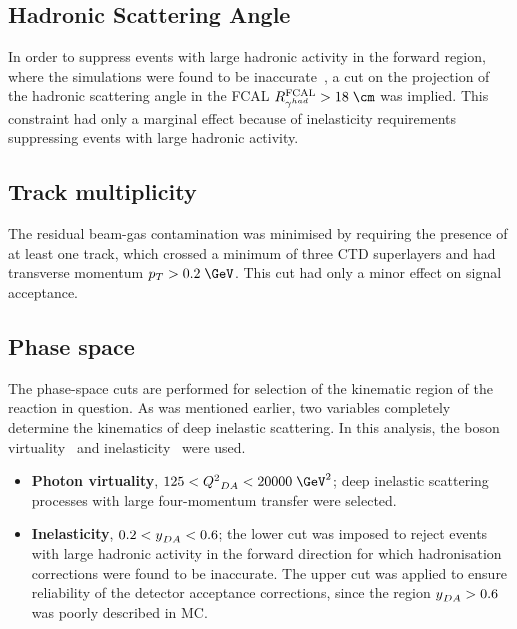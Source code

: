 \subsection{Hadronic Scattering Angle}
\label{subsec:gammahadcut}
In order to suppress events with large hadronic activity in the forward region, where the simulations were found to be inaccurate~\cite{thesis:jose:2003}, a cut on the projection of the hadronic scattering angle in the FCAL $R^\text{FCAL}_{\gamma^{had}} > 18\;\cm$ was implied. This constraint had only a marginal effect because of inelasticity requirements suppressing events with large hadronic activity.

\subsection{Track multiplicity}
\label{subsec:trackmultcut}
The residual beam-gas contamination was minimised by requiring the presence of at least one track, which crossed a minimum of three CTD superlayers and had transverse momentum $p_T>0.2\;\GeV$. This cut had only a minor effect on signal acceptance.

\subsection{Phase space}
\label{subsec:phasespace}
The phase-space cuts are performed for selection of the kinematic region of the reaction in question. As was mentioned earlier, two variables completely determine the kinematics of deep inelastic scattering. In this analysis, the boson virtuality \qsq~and inelasticity \y~were used.
\begin{itemize}
	\item \textbf{Photon virtuality}, $125 < \qsq_{DA} < 20000\;\GeV^2$;  deep inelastic scattering processes with large four-momentum transfer were selected.
	\item \textbf{Inelasticity}, $0.2 < \mbox{${y}$}_{DA} < 0.6$; the lower cut was imposed to reject events with large hadronic activity in the forward direction for which hadronisation corrections were found to be inaccurate. The upper cut was applied to ensure reliability of the detector acceptance corrections, since the region $\mbox{${y}$}_{DA} > 0.6$ was poorly described in MC.
\end{itemize}

